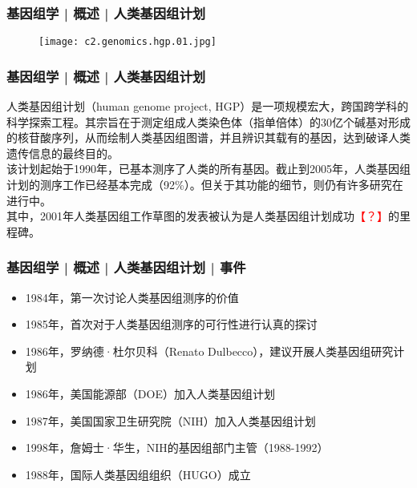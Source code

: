 \begin{frame}
  \frametitle{基因组学 | 概述 | 人类基因组计划}
  \begin{figure}
    \centering
    \texttt{[image: c2.genomics.hgp.01.jpg]}
  \end{figure}
\end{frame}

\begin{frame}
  \frametitle{基因组学 | 概述 | 人类基因组计划}
人类基因组计划（human genome project, HGP）是一项规模宏大，跨国跨学科的科学探索工程。其宗旨在于测定组成人类染色体（指单倍体）的30亿个碱基对形成的核苷酸序列，从而绘制人类基因组图谱，并且辨识其载有的基因，达到破译人类遗传信息的最终目的。\\
\vspace{1em}
该计划起始于1990年，已基本测序了人类的所有基因。截止到2005年，人类基因组计划的测序工作已经基本完成（92\%）。但关于其功能的细节，则仍有许多研究在进行中。\\
\vspace{1em}
其中，2001年人类基因组工作草图的发表被认为是人类基因组计划成功\textcolor{red}{【？】}的里程碑。
\end{frame}

\begin{frame}
  \frametitle{基因组学 | 概述 | 人类基因组计划 | 事件}
  \begin{itemize}[<+->]
    \item 1984年，第一次讨论人类基因组测序的价值
    \item 1985年，首次对于人类基因组测序的可行性进行认真的探讨
    \item 1986年，罗纳德·杜尔贝科（Renato Dulbecco），建议开展人类基因组研究计划
    \item 1986年，美国能源部（DOE）加入人类基因组计划
    \item 1987年，美国国家卫生研究院（NIH）加入人类基因组计划
    \item 1998年，詹姆士·华生，NIH的基因组部门主管（1988-1992）
    \item 1988年，国际人类基因组组织（HUGO）成立
  \end{itemize}
\end{frame}


